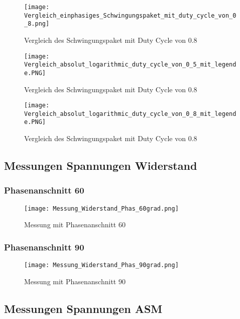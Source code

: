 \begin{appendix}
\newpage

\begin{figure}[ht!]
	\centering
	\texttt{[image: Vergleich\_einphasiges\_Schwingungspaket\_mit\_duty\_cycle\_von\_0\_8.png]}	
	\caption{Vergleich des Schwingungspaket mit Duty Cycle von 0.8}
	\label{fig:Vergleich des Schwingungspaket mit Duty Cycle von 0.8}
\end{figure}

\begin{figure}[ht!]
	\centering
	\texttt{[image: Vergleich\_absolut\_logarithmic\_duty\_cycle\_von\_0\_5\_mit\_legende.PNG]}	
	\caption{Vergleich des Schwingungspaket mit Duty Cycle von 0.8}
	\label{fig:Vergleich_absolut_logarithmic_duty_cycle_von_0_5_mit_legende}
\end{figure}

\begin{figure}[ht!]
	\centering
	\texttt{[image: Vergleich\_absolut\_logarithmic\_duty\_cycle\_von\_0\_8\_mit\_legende.PNG]}	
	\caption{Vergleich des Schwingungspaket mit Duty Cycle von 0.8}
	\label{fig:Vergleich_absolut_logarithmic_duty_cycle_von_0_8_mit_legende}
\end{figure}

\newpage
\subsection{Messungen Spannungen Widerstand}\label{sec:Mess_Spannung_Widerstand}
\subsubsection*{Phasenanschnitt 60\textdegree}

\begin{figure}[ht!]
	\centering
	\texttt{[image: Messung\_Widerstand\_Phas\_60grad.png]}	
	\caption{Messung mit Phasenanschnitt 60\textdegree}\label{fig:Mess_Phas_60}
\end{figure}
\newpage
\subsubsection*{Phasenanschnitt 90\textdegree}
\begin{figure}[ht!]
	\centering
	\texttt{[image: Messung\_Widerstand\_Phas\_90grad.png]}	
	\caption{Messung mit Phasenanschnitt 90\textdegree}\label{fig:Mess_Phas_90}
\end{figure}

\newpage
\subsection{Messungen Spannungen ASM}\label{sec:Mess_Spannung_ASM}

\end{appendix}
